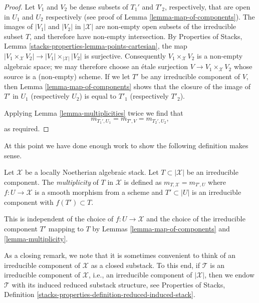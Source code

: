 \begin{proof}
Let $V_1$ and $V_2$ be dense subsets of $T_1'$ and $T'_2$, respectively,
that are open in $U_1$ and $U_2$ respectively (see proof of
Lemma \ref{lemma-map-of-components}).
The images of $|V_1|$ and $|V_2|$ in $|\mathcal{X}|$ are non-empty open
subsets of the irreducible subset $T$, and therefore have non-empty
intersection. By
Properties of Stacks, Lemma \ref{stacks-properties-lemma-points-cartesian},
the map $|V_1 \times_\mathcal{X} V_2| \to |V_1| \times_{|\mathcal{X}|} |V_2|$
is surjective. Consequently $V_1 \times_\mathcal{X} V_2$
is a non-empty algebraic space; we may therefore choose an
\'etale surjection $V \to V_1 \times_\mathcal{X} V_2$
whose source is a (non-empty) scheme.
If we let $T'$ be any irreducible component of $V$,
then Lemma \ref{lemma-map-of-components} shows that the closure of
the image of $T'$ in $U_1$ (respectively $U_2$) is equal to $T'_1$
(respectively $T'_2$).

\medskip\noindent
Applying Lemma \ref{lemma-multiplicities} twice we find
that
$$
m_{T_1', U_1} = m_{T', V} = m_{T_2', U_2},
$$
as required.
\end{proof}

\noindent
At this point we have done enough work to show the following
definition makes sense.

\begin{definition}
\label{definition-multiplicity}
Let $\mathcal{X}$ be a locally Noetherian algebraic stack. Let
$T \subset |\mathcal{X}|$ be an irreducible component.
The {\it multiplicity} of $T$ in $\mathcal{X}$ is defined as
$m_{T, \mathcal{X}} = m_{T', U}$ where $f : U \to \mathcal{X}$
is a smooth morphism from a scheme and $T' \subset |U|$
is an irreducible component with $f(T') \subset T$.
\end{definition}

\noindent
This is independent of the choice of $f : U \to \mathcal{X}$
and the choice of the irreducible component $T'$ mapping to $T$
by Lemmas \ref{lemma-map-of-components} and \ref{lemma-multiplicity}.

\medskip\noindent
As a closing remark, we note that it is sometimes convenient to think
of an irreducible component of $\mathcal{X}$ as a closed substack.
To this end, if $\mathcal{T}$ is an irreducible component of
$\mathcal{X}$, i.e., an irreducible component of $|\mathcal{X}|$,
then we endow $\mathcal{T}$ with its induced reduced substack structure, see
Properties of Stacks, Definition
\ref{stacks-properties-definition-reduced-induced-stack}.




